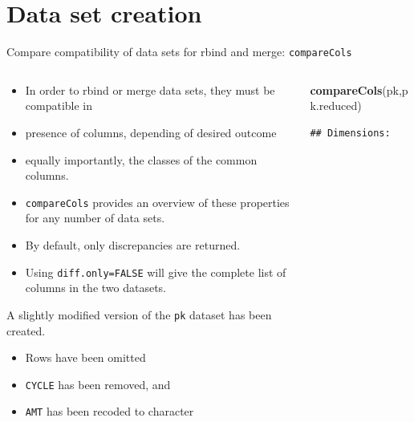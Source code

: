 \documentclass[
  8pt,
  ignorenonframetext,
  aspectratio=169]{beamer}
\newenvironment{Shaded}{\begin{snugshade}}{\end{snugshade}}
\newcommand{\KeywordTok}[1]{\textcolor[rgb]{0.13,0.29,0.53}{\textbf{#1}}}
\newcommand{\NormalTok}[1]{#1}
\providecommand{\tightlist}{%
  \setlength{\itemsep}{0pt}\setlength{\parskip}{0pt}}
\begin{document}
\hypertarget{data-set-creation}{%
\section{Data set creation}\label{data-set-creation}}

\begin{frame}[fragile]{Compare compatibility of data sets for rbind and
merge: \texttt{compareCols}}
\protect\hypertarget{compare-compatibility-of-data-sets-for-rbind-and-merge-comparecols}{}
\begin{columns}[T]
\begin{column}{0.48\textwidth}
\begin{itemize}
\tightlist
\item
  In order to rbind or merge data sets, they must be compatible in
\item
  presence of columns, depending of desired outcome
\item
  equally importantly, the classes of the common columns.
\item
  \texttt{compareCols} provides an overview of these properties for any
  number of data sets.
\item
  By default, only discrepancies are returned.
\item
  Using \texttt{diff.only=FALSE} will give the complete list of columns
  in the two datasets.
\end{itemize}

A slightly modified version of the \texttt{pk} dataset has been created.

\begin{itemize}
\tightlist
\item
  Rows have been omitted
\item
  \texttt{CYCLE} has been removed, and
\item
  \texttt{AMT} has been recoded to character
\end{itemize}
\end{column}

\begin{column}{0.48\textwidth}
\begin{Shaded}
\begin{Highlighting}[]
\KeywordTok{compareCols}\NormalTok{(pk,pk.reduced)}
\end{Highlighting}
\end{Shaded}

\begin{verbatim}
## Dimensions:
\end{verbatim}


\end{column}
\end{columns}
\end{frame}
\end{document}
